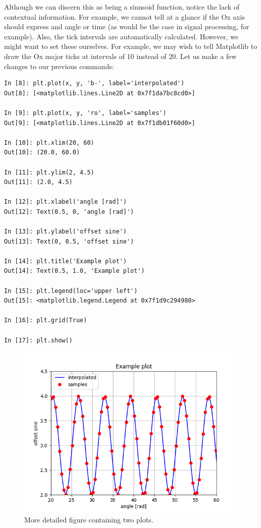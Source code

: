 Although we can discern this as being a sinusoid function, notice the lack of
contextual information. For example, we cannot tell at a glance if the Ox axis
should express and angle or time (as would be the case in signal processing,
for example). Also, the tick intervals are automatically calculated. However,
we might want to set these ourselves. For example, we may wish to tell
Matplotlib to draw the Ox major ticks at intervals of 10 instead of 20. Let us
make a few changes to our previous commands:


\begin{lstlisting}[style=pythonstyle]
In [8]: plt.plot(x, y, 'b-', label='interpolated')
Out[8]: [<matplotlib.lines.Line2D at 0x7f1da7bc8cd0>]

In [9]: plt.plot(x, y, 'ro', label='samples')
Out[9]: [<matplotlib.lines.Line2D at 0x7f1db01f60d0>]

In [10]: plt.xlim(20, 60)
Out[10]: (20.0, 60.0)

In [11]: plt.ylim(2, 4.5)
Out[11]: (2.0, 4.5)

In [12]: plt.xlabel('angle [rad]')
Out[12]: Text(0.5, 0, 'angle [rad]')

In [13]: plt.ylabel('offset sine')
Out[13]: Text(0, 0.5, 'offset sine')

In [14]: plt.title('Example plot')
Out[14]: Text(0.5, 1.0, 'Example plot')

In [15]: plt.legend(loc='upper left')
Out[15]: <matplotlib.legend.Legend at 0x7f1d9c294980>

In [16]: plt.grid(True)

In [17]: plt.show()
\end{lstlisting}

\begin{figure}
    \centering
    \includegraphics[width=0.55 \textwidth,keepaspectratio]{figures/figure-2.png}
    \caption{More detailed figure containing two plots.}
    \label{fig:simple}
\end{figure}

